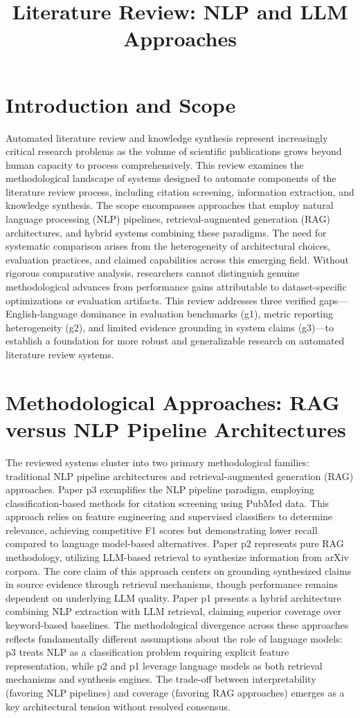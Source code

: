 \documentclass{article}
\title{Literature Review: NLP and LLM Approaches}
\begin{document}
\maketitle
\section{Introduction and Scope}
Automated literature review and knowledge synthesis represent increasingly critical research problems as the volume of scientific publications grows beyond human capacity to process comprehensively. This review examines the methodological landscape of systems designed to automate components of the literature review process, including citation screening, information extraction, and knowledge synthesis. The scope encompasses approaches that employ natural language processing (NLP) pipelines, retrieval-augmented generation (RAG) architectures, and hybrid systems combining these paradigms. The need for systematic comparison arises from the heterogeneity of architectural choices, evaluation practices, and claimed capabilities across this emerging field. Without rigorous comparative analysis, researchers cannot distinguish genuine methodological advances from performance gains attributable to dataset-specific optimizations or evaluation artifacts. This review addresses three verified gaps—English-language dominance in evaluation benchmarks (g1), metric reporting heterogeneity (g2), and limited evidence grounding in system claims (g3)—to establish a foundation for more robust and generalizable research on automated literature review systems.

\section{Methodological Approaches: RAG versus NLP Pipeline Architectures}
The reviewed systems cluster into two primary methodological families: traditional NLP pipeline architectures and retrieval-augmented generation (RAG) approaches. Paper p3 exemplifies the NLP pipeline paradigm, employing classification-based methods for citation screening using PubMed data. This approach relies on feature engineering and supervised classifiers to determine relevance, achieving competitive F1 scores but demonstrating lower recall compared to language model-based alternatives. Paper p2 represents pure RAG methodology, utilizing LLM-based retrieval to synthesize information from arXiv corpora. The core claim of this approach centers on grounding synthesized claims in source evidence through retrieval mechanisms, though performance remains dependent on underlying LLM quality. Paper p1 presents a hybrid architecture combining NLP extraction with LLM retrieval, claiming superior coverage over keyword-based baselines. The methodological divergence across these approaches reflects fundamentally different assumptions about the role of language models: p3 treats NLP as a classification problem requiring explicit feature representation, while p2 and p1 leverage language models as both retrieval mechanisms and synthesis engines. The trade-off between interpretability (favoring NLP pipelines) and coverage (favoring RAG approaches) emerges as a key architectural tension without resolved consensus.
\end{document}

